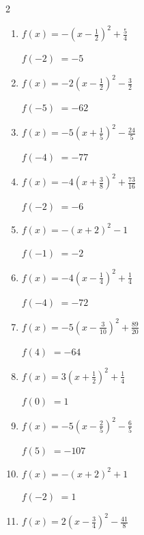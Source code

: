 \begin{multicols}{2}
\begin{enumerate}
  \itemsep=90pt
  \item $\displaystyle f(x)=-\left( x-\frac{1}{2}\right)^{2}+\frac{5}{4}$

$f(-2)$
        $=-5$

  \item $\displaystyle f(x)=-2\left( x-\frac{1}{2}\right)^{2}-\frac{3}{2}$

$f(-5)$
        $=-62$

  \item $\displaystyle f(x)=-5\left( x+\frac{1}{5}\right)^{2}-\frac{24}{5}$

$f(-4)$
        $=-77$

  \item $\displaystyle f(x)=-4\left( x+\frac{3}{8}\right)^{2}+\frac{73}{16}$

$f(-2)$
        $=-6$

  \item $\displaystyle f(x)=-\left( x+2\right)^{2}-1$

$f(-1)$
        $=-2$

\columnbreak %

  \item $\displaystyle f(x)=-4\left( x-\frac{1}{4}\right)^{2}+\frac{1}{4}$

$f(-4)$
        $=-72$

  \item $\displaystyle f(x)=-5\left( x-\frac{3}{10}\right)^{2}+\frac{89}{20}$

$f(4)$
        $=-64$

  \item $\displaystyle f(x)=3\left( x+\frac{1}{2}\right)^{2}+\frac{1}{4}$

$f(0)$
        $=1$

  \item $\displaystyle f(x)=-5\left( x-\frac{2}{5}\right)^{2}-\frac{6}{5}$

$f(5)$
        $=-107$

  \item $\displaystyle f(x)=-\left( x+2\right)^{2}+1$

$f(-2)$
        $=1$

\columnbreak %

\resetques

  \item $\displaystyle f(x)=2\left( x-\frac{3}{4}\right)^{2}-\frac{41}{8}$


\end{enumerate}
\end{multicols}

